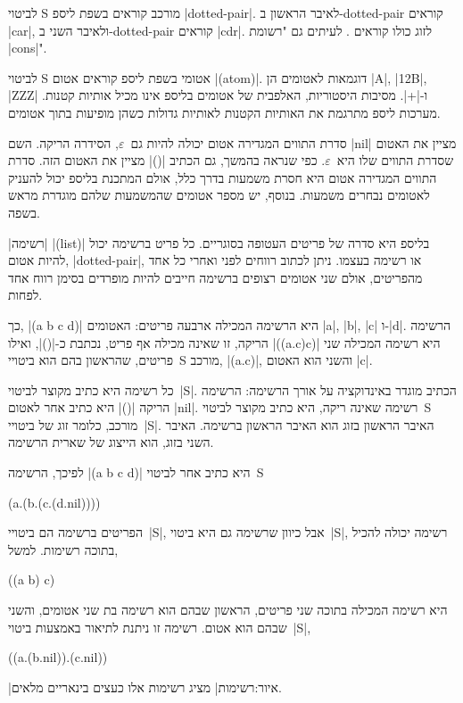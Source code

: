 לביטוי S מורכב קוראים בשפת ליספ \E|dotted-pair|. לאיבר הראשון ב-dotted-pair
קוראים \E|car|, ולאיבר השני ב-dotted-pair קוראים \E|cdr|. לזוג כולו קוראים
.
לעיתים גם "רשומת \E|cons|".

לביטוי S אטומי בשפת ליספ קוראים אטום \E|(atom)|. דוגמאות לאטומים הן \E|A|,
\E|12B|, \E|ZZZ| ו-\E|+|. מסיבות היסטוריות, האלפבית של אטומים בליספ אינו מכיל
אותיות קטנות. מערכות ליספ מתרגמת את האותיות הקטנות לאותיות גדולות כשהן מופיעות
בתוך אטומים.

סדרת התווים המגדירה אטום יכולה להיות גם~$ε$, הסידרה הריקה. השם \E|nil| מציין את
האטום שסדרת התווים שלו היא~$ε$. כפי שנראה בהמשך, גם הכתיב \E|()| מציין את האטום
הזה. סדרת התווים המגדירה אטום היא חסרת משמעות בדרך כלל, אולם המתכנת בליספ יכול
להעניק לאטומים נבחרים משמעות. בנוסף, יש מספר אטומים שהמשמעות שלהם מוגדרת מראש
בשפה.

\ע|רשימה| \E|(list)| בליספ היא סדרה של פריטים העטופה בסוגריים. כל פריט ברשימה
יכול להיות אטום, \E|dotted-pair|, או רשימה בעצמו. ניתן לכתוב רווחים לפני ואחרי
כל אחד מהפריטים, אולם שני אטומים רצופים ברשימה חייבים להיות מופרדים בסימן רווח
אחד לפחות.

כך, \E|(a b c d)| היא הרשימה המכילה ארבעה פריטים: האטומים \E|a|, \E|b|, \E|c|
ו-\E|d|. הרשימה הריקה, זו שאינה מכילה אף פריט, נכתבת כ-\E|()|, ואילו
\E|((a.c)c)| היא רשימה המכילה שני פריטים, שהראשון בהם הוא ביטויי~S מורכב,
\E|(a.c)|, והשני הוא האטום \E|c|.

כל רשימה היא כתיב מקוצר לביטוי~\E|S|. הכתיב מוגדר באינדוקציה על אורך הרשימה:
הרשימה הריקה \E|()| היא כתיב אחר לאטום \E|nil|. רשימה שאינה ריקה, היא כתיב
מקוצר לביטוי~S מורכב, כלומר זוג של ביטויי~\E|S|. האיבר הראשון בזוג הוא האיבר
הראשון ברשימה. האיבר השני בזוג, הוא הייצוג של שארית הרשימה.

לפיכך, הרשימה \E|(a b c d)| היא כתיב אחר לביטוי~S
\begin{LISP}
(a.(b.(c.(d.nil))))
\end{LISP}

הפריטים ברשימה הם ביטויי~\E|S|, אבל כיוון שרשימה גם היא ביטוי~\E|S|, רשימה
יכולה להכיל בתוכה רשימות. למשל,
\begin{LISP}
  ((a b) c)
\end{LISP}
היא רשימה המכילה בתוכה שני פריטים, הראשון שבהם הוא רשימה בת שני אטומים, והשני
שבהם הוא אטום. רשימה זו ניתנת לתיאור באמצעות ביטוי~\E|S|,
\begin{LISP}
  ((a.(b.nil)).(c.nil))
\end{LISP}
|איור:רשימות| מציג רשימות אלו כעצים בינאריים מלאים.

